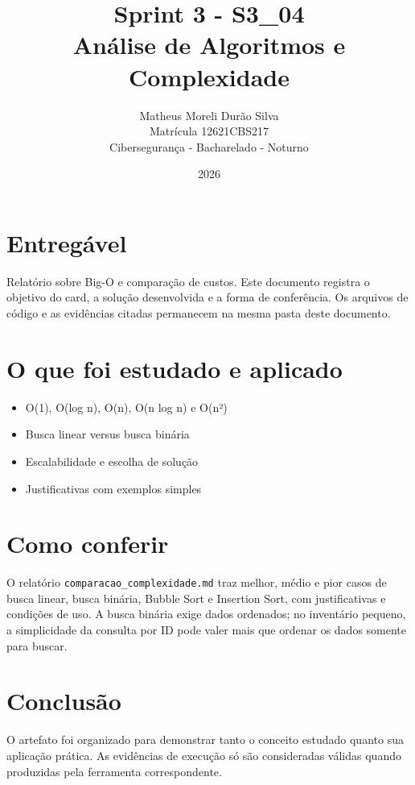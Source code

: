 \documentclass[12pt]{article}
\title{Sprint 3 - S3\_04\\Análise de Algoritmos e Complexidade}
\author{Matheus Moreli Durão Silva\\Matrícula 12621CBS217\\Cibersegurança - Bacharelado - Noturno}
\date{2026}
\begin{document}
\maketitle

\section*{Entregável}
Relatório sobre Big-O e comparação de custos. Este documento registra o objetivo do card, a solução desenvolvida e a forma de conferência. Os arquivos de código e as evidências citadas permanecem na mesma pasta deste documento.

\section*{O que foi estudado e aplicado}
\begin{itemize}
\item O(1), O(log n), O(n), O(n log n) e O(n²)
\item Busca linear versus busca binária
\item Escalabilidade e escolha de solução
\item Justificativas com exemplos simples
\end{itemize}

\section*{Como conferir}
O relatório \texttt{comparacao\_complexidade.md} traz melhor, médio e pior casos de busca linear, busca binária, Bubble Sort e Insertion Sort, com justificativas e condições de uso. A busca binária exige dados ordenados; no inventário pequeno, a simplicidade da consulta por ID pode valer mais que ordenar os dados somente para buscar.

\section*{Conclusão}
O artefato foi organizado para demonstrar tanto o conceito estudado quanto sua aplicação prática. As evidências de execução só são consideradas válidas quando produzidas pela ferramenta correspondente.
\end{document}
